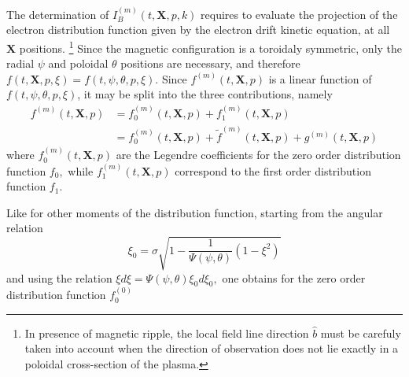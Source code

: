 The determination of $I_{B}^{\left(m\right) }\left( t,\mathbf{X},p,k\right) $
requires to evaluate the projection of the electron distribution function
given by the electron drift kinetic equation, at all $\mathbf{X}$ positions.%
\footnote{%
In presence of magnetic ripple, the local field line direction $\widehat{b}$
must be carefuly taken into account when the direction of observation does
not lie exactly in a poloidal cross-section of the plasma.} Since the
magnetic configuration is a toroidaly symmetric, only the radial $\psi$ and
poloidal $\theta$ positions are necessary, and therefore $f\left(t,\mathbf{X}%
,p,\xi\right)=f\left( t,\psi,\theta,p,\xi\right)$. Since $f^{\left( m\right)
}\left( t,\mathbf{X},p\right)$ is a linear function of $f\left(t,\psi,\theta
,p,\xi\right)$, it may be split into the three contributions, namely
\begin{align}
f^{\left( m\right) }\left( t,\mathbf{X},p\right) & =f_{0}^{\left( m\right)
}\left( t,\mathbf{X},p\right) +f_{1}^{\left( m\right) }\left( t,\mathbf{X}%
,p\right)  \nonumber \\
& =f_{0}^{\left( m\right) }\left( t,\mathbf{X},p\right) +\widetilde
{f}^{\left( m\right) }\left( t,\mathbf{X},p\right) +g^{\left( m\right)
}\left( t,\mathbf{X},p\right)
\end{align}
where $f_0^{\left( m\right)} \left( t,\mathbf{X},p\right) $ are the Legendre
coefficients for the zero order distribution function $f_0,$ while $%
f_1^{\left( m\right)} \left( t,\mathbf{X},p\right) $ correspond to the first
order distribution function $f_1$.

Like for other moments of the distribution function, starting from the
angular relation
\begin{equation}
\xi_{0}=\sigma\sqrt{1-\frac{1}{\Psi\left( \psi,\theta\right) }\left(
1-\xi^{2}\right) }  \label{angularcondition}
\end{equation}
and using the relation $\xi d\xi=\Psi\left( \psi,\theta\right)
\xi_{0}d\xi_{0},$ one obtains for the zero order distribution function $%
f_{0}^{\left( 0\right) }$

